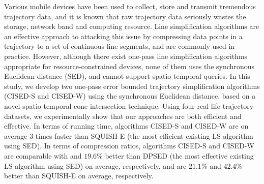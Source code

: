 Various mobile devices have been used to collect, store and transmit tremendous trajectory data, and it is known that raw trajectory data seriously wastes the storage, network band and computing resource. Line simplification algorithms are an effective approach to attacking this issue by compressing data points in a trajectory to a set of continuous line segments, and are commonly used in practice. However, although there exist one-pass line simplification algorithms appropriate for resource-constrained devices, none of them uses the synchronous Euclidean distance (SED), and cannot support spatio-temporal queries. In this study, we develop two one-pass error bounded trajectory simplification algorithms (CISED-S and  CISED-W) using the synchronous Euclidean distance, based on a novel spatio-temporal cone intersection technique. Using four real-life trajectory datasets, we experimentally show that our approaches are both efficient and effective. In terms of running time, algorithms CISED-S and  CISED-W are on average $3$ times faster than SQUISH-E (the most efficient existing LS algorithm using SED). In terms of compression ratios, algorithms CISED-S and  CISED-W are comparable with and $19.6\%$ better than DPSED (the most effective existing LS algorithm using SED) on average, respectively, and are $21.1\%$ and $42.4\%$ better than SQUISH-E on average, respectively. 